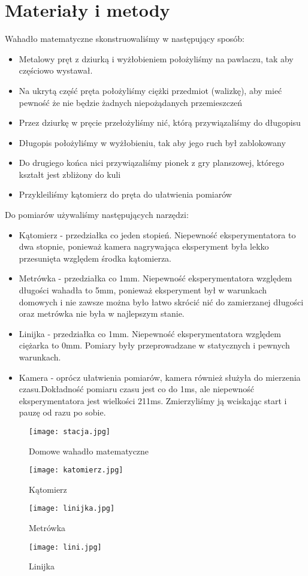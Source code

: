 \documentclass{article}
\begin{document}
\section{Materiały i metody}
Wahadło matematyczne skonstruowaliśmy w następujący sposób:
\begin{itemize}
    \item Metalowy pręt z dziurką i wyżłobieniem położyliśmy na pawlaczu, tak aby częściowo wystawał.
    \item Na ukrytą część pręta położyliśmy ciężki przedmiot (walizkę), aby mieć pewność że nie będzie żadnych niepożądanych przemieszczeń
    \item Przez dziurkę w pręcie przełożyliśmy nić, którą przywiązaliśmy do długopisu
    \item Długopis położyliśmy w wyżłobieniu, tak aby jego ruch był zablokowany
    \item Do drugiego końca nici przywiązaliśmy pionek z gry planszowej, którego kształt jest zbliżony do kuli
    \item Przykleiliśmy kątomierz do pręta do ułatwienia pomiarów
\end{itemize}
Do pomiarów używaliśmy następujących narzędzi:
\begin{itemize}
    \item Kątomierz - przedziałka co jeden stopień. Niepewność eksperymentatora to dwa stopnie, ponieważ kamera nagrywająca eksperyment była lekko przesunięta względem środka kątomierza.
    \item Metrówka - przedziałka co 1mm. Niepewność eksperymentatora względem długości wahadła to 5mm, ponieważ eksperyment był w warunkach domowych i nie zawsze można było łatwo skrócić nić do zamierzanej długości oraz metrówka nie była w najlepszym stanie.
    \item Linijka - przedziałka co 1mm. Niepewność eksperymentatora względem ciężarka to 0mm. Pomiary były przeprowadzane w statycznych i pewnych warunkach.
    \item Kamera - oprócz ułatwienia pomiarów, kamera również służyła do mierzenia czasu.Dokładność pomiaru czasu jest co do 1ms, ale niepewność eksperymentatora jest wielkości 211ms. Zmierzyliśmy ją wciskając start i pauzę od razu po sobie.
\end{itemize}
\clearpage
\begin{figure}[H]
\centerline{\texttt{[image: stacja.jpg]}}
\caption{Domowe wahadło matematyczne}
\end{figure}
\begin{figure}[H]
\centerline{\texttt{[image: katomierz.jpg]}}
\caption{Kątomierz}
\end{figure}
\begin{figure}[H]
\centerline{\texttt{[image: linijka.jpg]}}
\caption{Metrówka}
\end{figure}
\begin{figure}[H]
\centerline{\texttt{[image: lini.jpg]}}
\caption{Linijka}
\end{figure}
\clearpage
\end{document}
